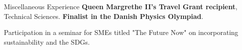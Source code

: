 \begin{rubric}{Miscellaneous Experience}
\entry*[2023] \textbf{Queen Margrethe II’s Travel Grant recipient}, Technical Sciences.
\entry*[] \textbf{Finalist in the Danish Physics Olympiad}.

\entry*[] Participation in a seminar for SMEs titled "The Future Now" on incorporating sustainability and the SDGs.



\end{rubric}